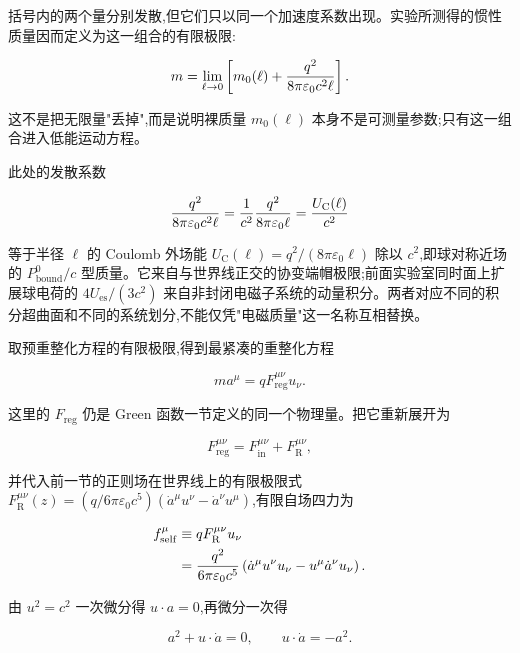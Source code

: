 括号内的两个量分别发散,但它们只以同一个加速度系数出现。实验所测得的惯性质量因而定义为这一组合的有限极限:

\begin{equation*}
 m
 =\lim_{\ell\to0}
 \left[
 m_0(\ell)
 +{q^2\over8\pi\varepsilon_0c^2\ell}
 \right].
\end{equation*}

这不是把无限量"丢掉",而是说明裸质量 $m_0(\ell)$ 本身不是可测量参数;只有这一组合进入低能运动方程。

此处的发散系数

\begin{equation*}
 {q^2\over8\pi\varepsilon_0c^2\ell}
 ={1\over c^2}{q^2\over8\pi\varepsilon_0\ell}
 ={U_{\mathrm C}(\ell)\over c^2}
\end{equation*}

等于半径 $\ell$ 的 Coulomb 外场能 $U_{\mathrm C}(\ell)=q^2/(8\pi\varepsilon_0\ell)$ 除以 $c^2$,即球对称近场的 $P_{\mathrm{bound}}^0/c$ 型质量。它来自与世界线正交的协变端帽极限;前面实验室同时面上扩展球电荷的 $4U_{\mathrm{es}}/(3c^2)$ 来自非封闭电磁子系统的动量积分。两者对应不同的积分超曲面和不同的系统划分,不能仅凭"电磁质量"这一名称互相替换。

取预重整化方程的有限极限,得到最紧凑的重整化方程

\begin{equation*}
 ma^\mu=qF_{\mathrm{reg}}^{\mu\nu}u_\nu.
\end{equation*}

这里的 $F_{\mathrm{reg}}$ 仍是 Green 函数一节定义的同一个物理量。把它重新展开为

\begin{equation*}
 F_{\mathrm{reg}}^{\mu\nu}
 =F_{\mathrm{in}}^{\mu\nu}+F_{\mathrm R}^{\mu\nu},
\end{equation*}

并代入前一节的正则场在世界线上的有限极限式 $F_{\mathrm R}^{\mu\nu}(z)=(q/6\pi\varepsilon_0c^5)(\dot a^\mu u^\nu-\dot a^\nu u^\mu)$,有限自场四力为

\begin{align*}
 f_{\mathrm{self}}^\mu
 &\equiv qF_{\mathrm R}^{\mu\nu}u_\nu\\
 &={q^2\over6\pi\varepsilon_0c^5}
 \left(
 \dot a^\mu u^\nu u_\nu
 -u^\mu\dot a^\nu u_\nu
 \right).
\end{align*}

由 $u^2=c^2$ 一次微分得 $u\cdot a=0$,再微分一次得

\begin{equation*}
 a^2+u\cdot\dot a=0,
 \qquad
 u\cdot\dot a=-a^2.
\end{equation*}

